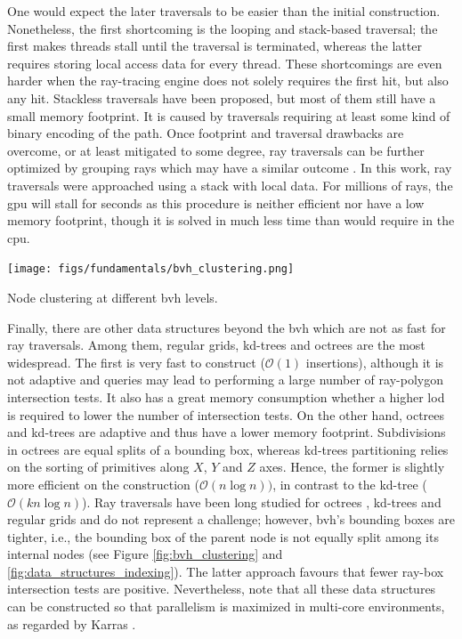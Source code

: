 One would expect the later traversals to be easier than the initial construction. Nonetheless, the first shortcoming is the looping and stack-based traversal; the first makes threads stall until the traversal is terminated, whereas the latter requires storing local access data for every thread. These shortcomings are even harder when the ray-tracing engine does not solely requires the first hit, but also any hit. Stackless traversals have been proposed, but most of them still have a small memory footprint\cite{meister_survey_2021}. It is caused by traversals requiring at least some kind of binary encoding of the path. Once footprint and traversal drawbacks are overcome, or at least mitigated to some degree, ray traversals can be further optimized by grouping rays which may have a similar outcome \cite{hendrich_ray_2019}. In this work, ray traversals were approached using a stack with local data. For millions of rays, the \acrshort{gpu} will stall for seconds as this procedure is neither efficient nor have a low memory footprint, though it is solved in much less time than would require in the \acrshort{cpu}. 

\begin{marginfigure}[-4.0cm]
    \texttt{[image: figs/fundamentals/bvh\_clustering.png]}
	\caption{Node clustering at different \acrshort{bvh} levels. }
    \label{fig:bvh_clustering}
\end{marginfigure}
Finally, there are other data structures beyond the \acrshort{bvh} which are not as fast for ray traversals. Among them, regular grids, kd-trees and octrees are the most widespread. The first is very fast to construct ($\mathcal{O}(1)$ insertions), although it is not adaptive and queries may lead to performing a large number of ray-polygon intersection tests. It also has a great memory consumption whether a higher \acrshort{lod} is required to lower the number of intersection tests. On the other hand, octrees and kd-trees are adaptive and thus have a lower memory footprint. Subdivisions in octrees are equal splits of a bounding box, whereas kd-trees partitioning relies on the sorting of primitives along $X$, $Y$ and $Z$ axes. Hence, the former is slightly more efficient on the construction ($\mathcal{O}(n \log{n}))$, in contrast to the kd-tree ($\mathcal{O}(kn \log{n})$). Ray traversals have been long studied for octrees \cite{revelles_efficient_2000}, kd-trees \cite{dos_santos_kd-tree_2009} and regular grids \cite{amanatides_fast_1987} and do not represent a challenge; however, \acrshort{bvh}'s bounding boxes are tighter, i.e., the bounding box of the parent node is not equally split among its internal nodes (see Figure \ref{fig:bvh_clustering} and \ref{fig:data_structures_indexing}). The latter approach favours that fewer ray-box intersection tests are positive. Nevertheless, note that all these data structures can be constructed so that parallelism is maximized in multi-core environments, as regarded by Karras \cite{karras_maximizing_2012}.

